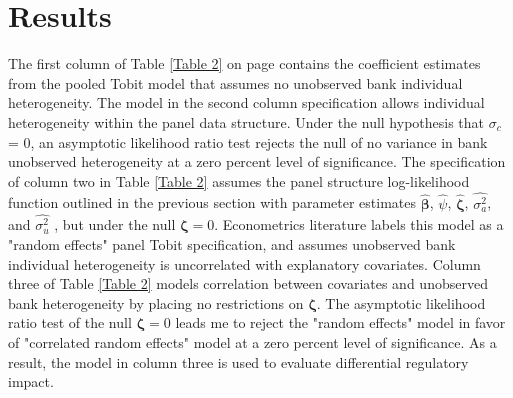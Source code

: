 \documentclass[preprint,12pt]{elsarticle}
\begin{document}
\section{Results}
The first column of Table \ref{Table 2} on page \pageref{Table 2} contains the coefficient estimates from the pooled Tobit model that assumes no unobserved bank individual heterogeneity.  The model in the second column specification allows individual heterogeneity within the panel data structure.  Under the null hypothesis that $\sigma_{c}$ = 0, an asymptotic likelihood ratio test rejects the null of no variance in bank unobserved heterogeneity at a zero percent level of significance.  The specification of column two in Table \ref{Table 2} assumes the panel structure log-likelihood function outlined in the previous section with parameter estimates $\bm{\hat{\beta}}$, $\hat{\psi}$, $\bm{\hat{\zeta}}$, $\hat{\sigma_{a}^{2}}$, and $\hat{\sigma_{u}^{2}}$ , but under the null $\bm{\zeta} = 0$.  Econometrics literature labels this model as a "random effects" panel Tobit specification, and assumes unobserved bank individual heterogeneity is uncorrelated with explanatory covariates.  Column three of Table \ref{Table 2} models correlation between covariates and unobserved bank heterogeneity by placing no restrictions on $\bm{\zeta}$.  The asymptotic likelihood ratio test of the null $\bm{\zeta} = 0$ leads me to reject the "random effects" model in favor of "correlated random effects" model at a zero percent level of significance.  As a result, the model in column three is used to evaluate differential regulatory impact.  
\end{document}
